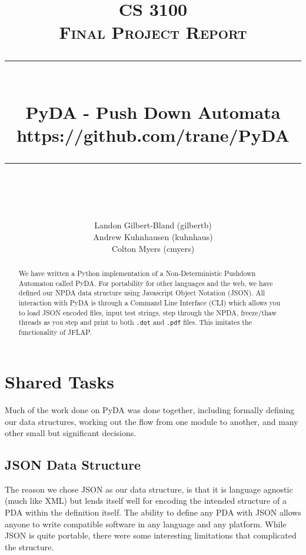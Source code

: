 \documentclass[a4paper]{report}
\newcommand{\HRule}{\rule{\linewidth}{0.5mm}}
\begin{document}
\title{ %
    \textsc{\LARGE CS 3100}\\[1.5cm]
    \textsc{\Large Final Project Report}\\[0.5cm]
    \HRule \\[0.4cm]
    { \huge \bfseries PyDA - Push Down Automata}\\
    { \small https://github.com/trane/PyDA }\\
    \HRule \\[1.5cm]
}
\author{
    Landon Gilbert-Bland (gilbertb)\\ %
    Andrew Kuhnhausen (kuhnhaus)\\%
    Colton Myers (cmyers)\\%
}
\maketitle

\begin{abstract}
We have written a Python implementation of a Non-Deterministic Pushdown
Automaton called PyDA. For portability for other languages and the web, we have
defined our NPDA data structure using Javascript Object Notation (JSON). All
interaction with PyDA is through a Command Line Interface (CLI) which allows you
to load JSON encoded files, input test strings, step through the NPDA,
freeze/thaw threads as you step and print to both \texttt{.dot} and
\texttt{.pdf} files.  This imitates the functionality of JFLAP.
\end{abstract}

\section*{Shared Tasks}
Much of the work done on PyDA was done together, including formally defining our
data structures, working out the flow from one module to another, and many other
small but significant decisions.
\subsection*{JSON Data Structure}
The reason we chose JSON as our data structure, is that it is language agnostic
(much like XML) but lends itself well for encoding the intended structure of a
PDA within the definition itself. The ability to define any PDA with JSON allows
anyone to write compatible software in any language and any platform. While JSON
is quite portable, there were some interesting limitations that complicated the
structure.
\end{document}
